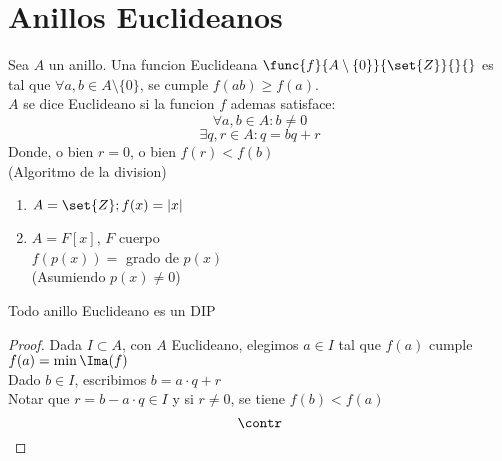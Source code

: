 \documentclass[11pt]{book}
\begin{document}
    \chapter{Anillos Euclideanos}
    Sea $A$ un anillo. Una funcion Euclideana $\func{f}{A\setminus\{0\}}{\set{Z}}{}{}$ es tal que $\forall a,b\in A\setminus\{0\}$, se cumple $f(ab)\geq f(a)$.\\
    $A$ se dice Euclideano si la funcion $f$ ademas satisface:
    \[\forall a,b \in A:b\neq 0\]
    \[\exists q,r\in A:q=bq+r\]
    Donde, o bien $r=0$, o bien $f(r)<f(b)$\\
    (Algoritmo de la division)
    \begin{ejm}
        \hfill
        \begin{enumerate}
            \item $A=\set{Z}; f(x)=|x|$

            \item $A=F[x]$, $F$ cuerpo\\
            $f(p(x))=$ grado de $p(x)$\\
            (Asumiendo $p(x)\neq 0$)
        \end{enumerate}
    \end{ejm}

    \begin{obs}
        Todo anillo Euclideano es un DIP
        \begin{proof}
            Dada $I\subset A$, con $A$ Euclideano, elegimos $a\in I$ tal que $f(a)$ cumple $f(a)=\min\Ima(f)$\\
            Dado $b\in I$, escribimos $b=a\cdot q+r$\\
            Notar que $r=b-a\cdot q\in I$ y si $r\neq 0$, se tiene $f(b)<f(a)$
            \[\contr\]
        \end{proof}
    \end{obs}
\end{document}
